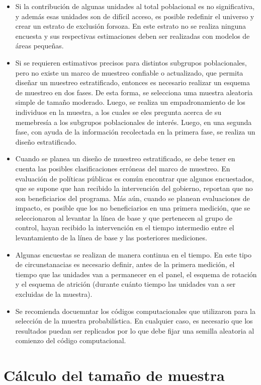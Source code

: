 \documentclass[
  12pt,
  spanish,
]{book}
\begin{document}
\begin{itemize}
\item Si la contribución de algunas unidades al total poblacional es no significativa, y además esas unidades son de difícil acceso, es posible redefinir el universo y crear un estrato de exclusión forsoza. En este estrato no se realiza ninguna encuesta y sus respectivas estimaciones deben ser realizadas con modelos de áreas pequeñas. 
\item Si se requieren estimativos precisos para distintos subgrupos poblacionales, pero no existe un marco de muestreo confiable o actualizado, que permita diseñar un muestreo estratificado, entonces es necesario realizar un esquema de muestreo en dos fases. De esta forma, se selecciona uma muestra aleatoria simple de tamaño moderado. Luego, se realiza un empadronamiento de los individuos en la muestra, a los cuales se eles pregunta acerca de su memebresía a los subgrupos poblacionales de interés. Luego, en una segunda fase, con ayuda de la información recolectada en la primera fase, se realiza un diseño estratificado.
\item Cuando se planea un diseño de muestreo estratificado, se debe tener en cuenta las posibles clasificaciones erróneas del marco de muestreo. En evaluación de políticas públicas es común encontrar que algunos encuestados, que se supone que han recibido la intervención del gobierno, reportan que no son beneficiarios del programa. Más aún, cuando se planean evaluaciones de impacto, es posible que los no beneficiarios en una primera medición, que se seleccionaron al levantar la línea de base y que pertenecen al grupo de control, hayan recibido la intervención en el tiempo intermedio entre el levantamiento de la línea de base y las posteriores mediciones. 
\item Algunas encuestas se realizan de manera continua en el tiempo. En este tipo de circunstanacias es necesario definir, antes de la primera medición, el tiempo que las unidades van a permanecer en el panel, el esquema de rotación y el esquema de atrición (durante cuánto tiempo las unidades van a ser excluidas de la muestra).
\item Se recomienda docuemntar los códigos computacionales que utilizaron para la selección de la muestra probabilística. En cualquier caso, es necesario que los resultados puedan ser replicados por lo que debe fijar una semilla aleatoria al comienzo del código computacional.
\end{itemize}

\hypertarget{cuxe1lculo-del-tamauxf1o-de-muestra}{%
\chapter{Cálculo del tamaño de muestra}\label{cuxe1lculo-del-tamauxf1o-de-muestra}}
\end{document}
